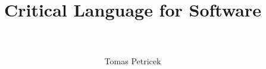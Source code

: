 \documentclass[fleqn,11pt]{report}
\begin{document}
\title{\Huge \textbf{Critical Language for Software}\\~\\}
\author{Tomas Petricek}
\maketitle


\end{document}
